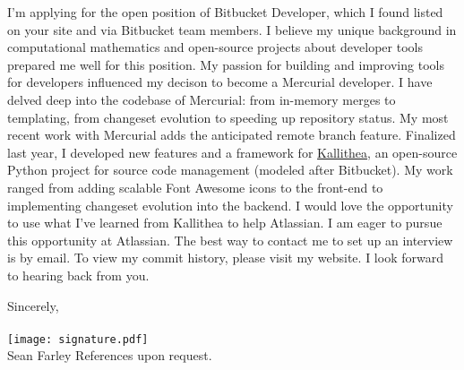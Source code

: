 \documentclass[]{fancy-cv}
\newcommand\company{Atlassian}
\newcommand\position{Bitbucket Developer}
\begin{document}
I'm applying for the open position of \position, which I found listed on your
site and via Bitbucket team members. I believe my unique background in
computational mathematics and open-source projects about developer tools
prepared me well for this position.
%
\newline\newline
%
My passion for building and improving tools for developers influenced my
decison to become a Mercurial developer. I have delved deep into the codebase
of Mercurial: from in-memory merges to templating, from changeset evolution to
speeding up repository status. My most recent work with Mercurial adds the
anticipated remote branch feature.
%
\newline\newline
%
Finalized last year, I developed new features and a framework for
\href{https://kallithea-scm.org}{Kallithea}, an open-source Python project for
source code management (modeled after Bitbucket). My work ranged from adding
scalable Font Awesome icons to the front-end to implementing changeset
evolution into the backend. I would love the opportunity to use what I've
learned from Kallithea to help \company.
%
\newline\newline
%
I am eager to pursue this opportunity at \company. The best way to contact me
to set up an interview is by email. To view my commit history, please visit my
website. I look forward to hearing back from you.

\vspace{2em}
Sincerely,\\
\\
\texttt{[image: signature.pdf]}
\\
Sean Farley
%
\newline\newline
%
References upon request.
\end{document}
